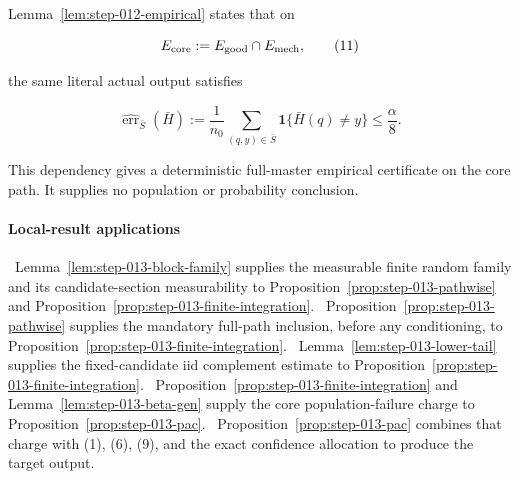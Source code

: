 Lemma~\ref{lem:step-012-empirical} states that on

\[
 E_{\rm core}:=E_{\rm good}\cap E_{\rm mech},
 \tag{11}
\]

the same literal actual output satisfies

\[
 \widehat{\operatorname{err}}_{\bar S}(\bar H)
 :=\frac1{n_0}\sum_{(q,y)\in\bar S}
       \mathbf1\{\bar H(q)\ne y\}
 \leq\frac{\alpha}{8}.
 \tag{12}
\]

This dependency gives a deterministic full-master empirical certificate on
the core path. It supplies no population or probability conclusion.

\paragraph{Local-result applications}

\noindent\textbullet\ Lemma~\ref{lem:step-013-block-family} supplies the measurable finite
  random family and its candidate-section measurability to
  Proposition~\ref{prop:step-013-pathwise} and
  Proposition~\ref{prop:step-013-finite-integration}.
\noindent\textbullet\ Proposition~\ref{prop:step-013-pathwise} supplies the mandatory
  full-path inclusion, before any conditioning, to
  Proposition~\ref{prop:step-013-finite-integration}.
\noindent\textbullet\ Lemma~\ref{lem:step-013-lower-tail} supplies the fixed-candidate iid
  complement estimate to
  Proposition~\ref{prop:step-013-finite-integration}.
\noindent\textbullet\ Proposition~\ref{prop:step-013-finite-integration} and
  Lemma~\ref{lem:step-013-beta-gen} supply the core population-failure
  charge to Proposition~\ref{prop:step-013-pac}.
\noindent\textbullet\ Proposition~\ref{prop:step-013-pac} combines that charge with (1), (6),
  (9), and the exact confidence allocation to produce the target output.




